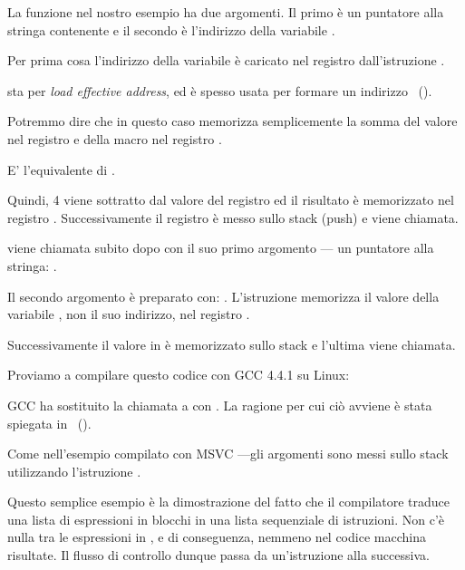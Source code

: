 La funzione \scanf nel nostro esempio ha due argomenti.
Il primo è un puntatore alla stringa contenente  e il secondo è l'indirizzo della variabile .

Per prima cosa l'indirizzo della variabile  è caricato nel registro \EAX dall'istruzione .

\LEA sta per \emph{load effective address}, ed è spesso usata per formare un indirizzo ~().

Potremmo dire che in questo caso \LEA memorizza semplicemente la somma del valore nel registro \EBP e della macro  nel registro \EAX.

E' l'equivalente di .

Quindi, 4 viene sottratto dal valore del registro \EBP ed il risultato è memorizzato nel registro \EAX.
Successivamente il registro \EAX è messo sullo stack (push) e \scanf viene chiamata.

\printf viene chiamata subito dopo con il suo primo argomento --- un puntatore alla stringa:
.

Il secondo argomento è preparato con: .
L'istruzione memorizza il valore della variabile ,  non il suo indirizzo, nel registro \ECX.

Successivamente il valore in \ECX è memorizzato sullo stack e l'ultima \printf viene chiamata.




Proviamo a compilare questo codice con GCC 4.4.1 su Linux:



GCC ha sostituito la chiamata a \printf con \puts. La ragione per cui ciò avviene è stata spiegata in ~().

% 

Come nell'esempio compilato con MSVC ---gli argomenti sono messi sullo stack utilizzando l'istruzione \MOV.


Questo semplice esempio è la dimostrazione del fatto che il compilatore traduce una lista di espressioni in blocchi \CCpp in una lista sequenziale di istruzioni.
Non c'è nulla tra le espressioni in \CCpp, e di conseguenza, nemmeno nel codice macchina risultate. Il flusso di controllo dunque passa da un'istruzione alla successiva.
